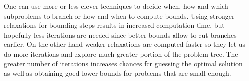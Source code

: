 \documentclass[12pt]{book}
\theoremstyle{definition}
\begin{document}
One can use more or less clever techniques to decide when, how and which subproblems to branch or how and when to compute bounds.
Using stronger relaxations for bounding steps results in increased computation time, but hopefully less iterations are needed since better bounds allow to cut branches earlier.  On the other hand weaker relaxations are computed faster so they let us do more iterations and explore much greater portion of the problem tree. The greater number of iterations increases chances for guessing the optimal solution as well as obtaining good lower bounds for problems that are small enough.





\end{document}
